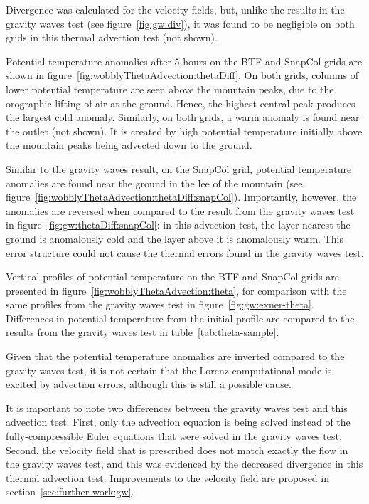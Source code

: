 Divergence was calculated for the velocity fields, but, unlike the results in the gravity waves test (see figure~\ref{fig:gw:div}), it was found to be negligible on both grids in this thermal advection test (not shown).

Potential temperature anomalies after 5 hours on the BTF and SnapCol grids are shown in figure~\ref{fig:wobblyThetaAdvection:thetaDiff}.  On both grids, columns of lower potential temperature are seen above the mountain peaks, due to the orographic lifting of air at the ground.  Hence, the highest central peak produces the largest cold anomaly.  Similarly, on both grids, a warm anomaly is found near the outlet (not shown).  It is created by high potential temperature initially above the mountain peaks being advected down to the ground.

Similar to the gravity waves result, on the SnapCol grid, potential temperature anomalies are found near the ground in the lee of the mountain (see figure~\ref{fig:wobblyThetaAdvection:thetaDiff:snapCol}).  Importantly, however, the anomalies are reversed when compared to the result from the gravity waves test in figure~\ref{fig:gw:thetaDiff:snapCol}: in this advection test, the layer nearest the ground is anomalously cold and the layer above it is anomalously warm.  This error structure could not cause the thermal errors found in the gravity waves test.

Vertical profiles of potential temperature on the BTF and SnapCol grids are presented in figure~\ref{fig:wobblyThetaAdvection:theta}, for comparison with the same profiles from the gravity waves test in figure~\ref{fig:gw:exner-theta}.
Differences in potential temperature from the initial profile are compared to the results from the gravity waves test in table~\ref{tab:theta-sample}.

Given that the potential temperature anomalies are inverted compared to the gravity waves test, it is not certain that the Lorenz computational mode is excited by advection errors, although this is still a possible cause.

It is important to note two differences between the gravity waves test and this advection test.  First, only the advection equation is being solved instead of the fully-compressible Euler equations that were solved in the gravity waves test.  Second, the velocity field that is prescribed does not match exactly the flow in the gravity waves test, and this was evidenced by the decreased divergence in this thermal advection test.  Improvements to the velocity field are proposed in section~\ref{sec:further-work:gw}.

